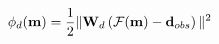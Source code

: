 \vspace{-0.1cm}
\begin{equation}
    \phi_{d}(\mathbf{m}) = \frac{1}{2} \| \mathbf{W}_d \left( \mathcal{F}(\mathbf{m}) - \mathbf{d}_{obs} \right) \|^{2}
    \label{eq:forward-pass}
    \vspace{-0.05cm}
\end{equation}